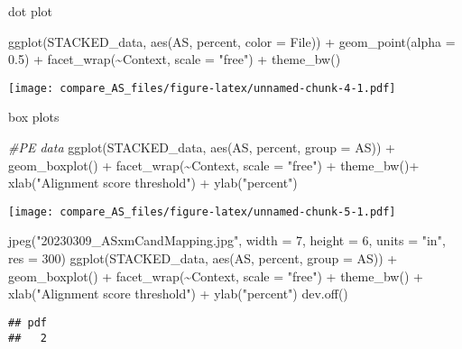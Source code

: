 \documentclass[
]{article}
\newenvironment{Shaded}{\begin{snugshade}}{\end{snugshade}}
\newcommand{\AttributeTok}[1]{\textcolor[rgb]{0.77,0.63,0.00}{#1}}
\newcommand{\CommentTok}[1]{\textcolor[rgb]{0.56,0.35,0.01}{\textit{#1}}}
\newcommand{\DecValTok}[1]{\textcolor[rgb]{0.00,0.00,0.81}{#1}}
\newcommand{\FloatTok}[1]{\textcolor[rgb]{0.00,0.00,0.81}{#1}}
\newcommand{\FunctionTok}[1]{\textcolor[rgb]{0.00,0.00,0.00}{#1}}
\newcommand{\NormalTok}[1]{#1}
\newcommand{\SpecialCharTok}[1]{\textcolor[rgb]{0.00,0.00,0.00}{#1}}
\newcommand{\StringTok}[1]{\textcolor[rgb]{0.31,0.60,0.02}{#1}}
\begin{document}
dot plot

\begin{Shaded}
\begin{Highlighting}[]
\FunctionTok{ggplot}\NormalTok{(STACKED\_data, }\FunctionTok{aes}\NormalTok{(AS, percent, }\AttributeTok{color =}\NormalTok{ File)) }\SpecialCharTok{+} \FunctionTok{geom\_point}\NormalTok{(}\AttributeTok{alpha =} \FloatTok{0.5}\NormalTok{) }\SpecialCharTok{+} \FunctionTok{facet\_wrap}\NormalTok{(}\SpecialCharTok{\textasciitilde{}}\NormalTok{Context, }\AttributeTok{scale =} \StringTok{"free"}\NormalTok{) }\SpecialCharTok{+} \FunctionTok{theme\_bw}\NormalTok{()}
\end{Highlighting}
\end{Shaded}

\texttt{[image: compare\_AS\_files/figure-latex/unnamed-chunk-4-1.pdf]}

box plots

\begin{Shaded}
\begin{Highlighting}[]
\CommentTok{\#PE data}
\FunctionTok{ggplot}\NormalTok{(STACKED\_data, }\FunctionTok{aes}\NormalTok{(AS, percent, }\AttributeTok{group =}\NormalTok{ AS)) }\SpecialCharTok{+} \FunctionTok{geom\_boxplot}\NormalTok{() }\SpecialCharTok{+} \FunctionTok{facet\_wrap}\NormalTok{(}\SpecialCharTok{\textasciitilde{}}\NormalTok{Context, }\AttributeTok{scale =} \StringTok{"free"}\NormalTok{) }\SpecialCharTok{+} \FunctionTok{theme\_bw}\NormalTok{()}\SpecialCharTok{+} \FunctionTok{xlab}\NormalTok{(}\StringTok{"Alignment score threshold"}\NormalTok{) }\SpecialCharTok{+} \FunctionTok{ylab}\NormalTok{(}\StringTok{"percent"}\NormalTok{)}
\end{Highlighting}
\end{Shaded}

\texttt{[image: compare\_AS\_files/figure-latex/unnamed-chunk-5-1.pdf]}

\begin{Shaded}
\begin{Highlighting}[]
\FunctionTok{jpeg}\NormalTok{(}\StringTok{"20230309\_ASxmCandMapping.jpg"}\NormalTok{, }\AttributeTok{width =} \DecValTok{7}\NormalTok{, }\AttributeTok{height =} \DecValTok{6}\NormalTok{, }\AttributeTok{units =} \StringTok{"in"}\NormalTok{, }\AttributeTok{res =} \DecValTok{300}\NormalTok{)}
\FunctionTok{ggplot}\NormalTok{(STACKED\_data, }\FunctionTok{aes}\NormalTok{(AS, percent, }\AttributeTok{group =}\NormalTok{ AS)) }\SpecialCharTok{+} \FunctionTok{geom\_boxplot}\NormalTok{() }\SpecialCharTok{+} \FunctionTok{facet\_wrap}\NormalTok{(}\SpecialCharTok{\textasciitilde{}}\NormalTok{Context, }\AttributeTok{scale =} \StringTok{"free"}\NormalTok{) }\SpecialCharTok{+} \FunctionTok{theme\_bw}\NormalTok{() }\SpecialCharTok{+} \FunctionTok{xlab}\NormalTok{(}\StringTok{"Alignment score threshold"}\NormalTok{) }\SpecialCharTok{+} \FunctionTok{ylab}\NormalTok{(}\StringTok{"percent"}\NormalTok{)}
\FunctionTok{dev.off}\NormalTok{()}
\end{Highlighting}
\end{Shaded}

\begin{verbatim}
## pdf 
##   2
\end{verbatim}
\end{document}
